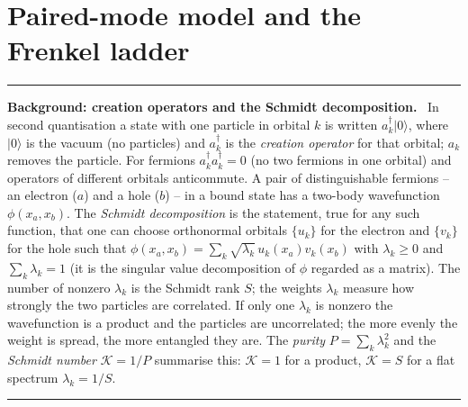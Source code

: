 \documentclass[11pt,a4paper]{article}
\newcommand{\ket}[1]{|#1\rangle}
\newenvironment{background}[1]{\par\medskip\noindent\hrule\smallskip\noindent\textbf{Background: #1.}\ \ignorespaces}{\par\smallskip\noindent\hrule\medskip}
\begin{document}
\begin{figure}[t]
\label{fig:scheme}
\end{figure}

\section{Paired-mode model and the Frenkel ladder}
\label{sec:model}

\begin{background}{creation operators and the Schmidt decomposition}
In second quantisation a state with one particle in orbital $k$ is written $a_k^\dagger\ket0$, where $\ket0$ is the vacuum (no particles) and $a_k^\dagger$ is the \emph{creation operator} for that orbital; $a_k$ removes the particle. For fermions $a_k^\dagger a_k^\dagger=0$ (no two fermions in one orbital) and operators of different orbitals anticommute. A pair of distinguishable fermions -- an electron ($a$) and a hole ($b$) -- in a bound state has a two-body wavefunction $\phi(x_a,x_b)$. The \emph{Schmidt decomposition} is the statement, true for any such function, that one can choose orthonormal orbitals $\{u_k\}$ for the electron and $\{v_k\}$ for the hole such that $\phi(x_a,x_b)=\sum_k\sqrt{\lambda_k}\,u_k(x_a)v_k(x_b)$ with $\lambda_k\ge0$ and $\sum_k\lambda_k=1$ (it is the singular value decomposition of $\phi$ regarded as a matrix). The number of nonzero $\lambda_k$ is the Schmidt rank $S$; the weights $\lambda_k$ measure how strongly the two particles are correlated. If only one $\lambda_k$ is nonzero the wavefunction is a product and the particles are uncorrelated; the more evenly the weight is spread, the more entangled they are. The \emph{purity} $P=\sum_k\lambda_k^2$ and the \emph{Schmidt number} $\mathcal K=1/P$ summarise this: $\mathcal K=1$ for a product, $\mathcal K=S$ for a flat spectrum $\lambda_k=1/S$.
\end{background}
\end{document}
